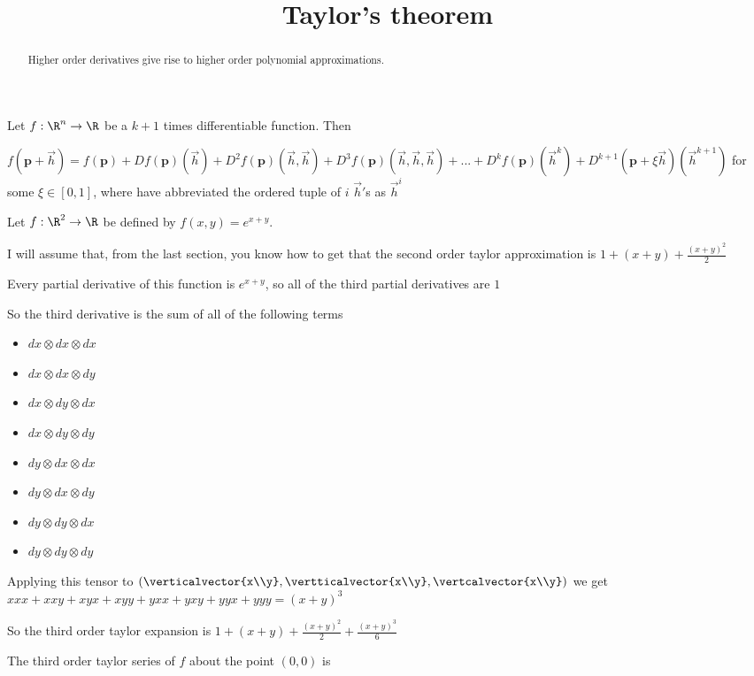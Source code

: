\documentclass{ximera}
\title{Taylor's theorem}
\begin{document}
\begin{abstract}
	Higher order derivatives give rise to higher order polynomial approximations.
\end{abstract}

\begin{theorem}
	Let $f:\R^n \to \R$ be a $k+1$ times differentiable function.  Then
	
	$f(\mathbf{p}+\vec{h}) 
	= f(\mathbf{p})+Df(\mathbf{p})(\vec{h})+D^2f(\mathbf{p})(\vec{h},\vec{h})+D^3f(\mathbf{p})(\vec{h},\vec{h},\vec{h})+...
	+D^kf(\mathbf{p})(\vec{h}^k) + D^{k+1}(\mathbf{p}+\xi\vec{h})(\vec{h}^{k+1})$ for some $\xi \in [0,1]$,  where have abbreviated the 
	ordered tuple of $i$ $\vec{h}'$s as $\vec{h}^i$
\end{theorem}

	\begin{question}
		Let $f:\R^2 \to \R$ be defined by $f(x,y) = e^{x+y}$.  
		\begin{solution}
			\begin{hint}
				I will assume that, from the last section, you know how to get that the second order taylor approximation is $1+(x+y)+\frac{(x+y)^2}{2}$
			\end{hint}
			\begin{hint}
				Every partial derivative of this function is $e^{x+y}$, so all of the third partial derivatives are $1$
			\end{hint}
			\begin{hint}
				So the third derivative is the sum of all of the following terms 
				\begin{itemize}
					\item $dx \otimes dx \otimes dx$
					\item $dx \otimes dx \otimes dy$
					\item $dx \otimes dy \otimes dx$
					\item $dx \otimes dy \otimes dy$
					\item $dy \otimes dx \otimes dx$
					\item $dy \otimes dx \otimes dy$
					\item $dy \otimes dy \otimes dx$
					\item $dy \otimes dy \otimes dy$
				\end{itemize}
			\end{hint}
			\begin{hint}
				Applying this tensor to $(\verticalvector{x\\y},\vertticalvector{x\\y},\vertcalvector{x\\y})$ we get 
				$xxx+xxy+xyx+xyy+yxx+yxy+yyx+yyy = (x+y)^3$
			\end{hint}
			\begin{hint}
				So the third order taylor expansion is $1+(x+y)+\frac{(x+y)^2}{2}+\frac{(x+y)^3}{6}$
			\end{hint}
			The third order taylor series of $f$ about the point $(0,0)$ is 
		\end{solution}
	\end{question}
	
	
	
	
\end{document}
